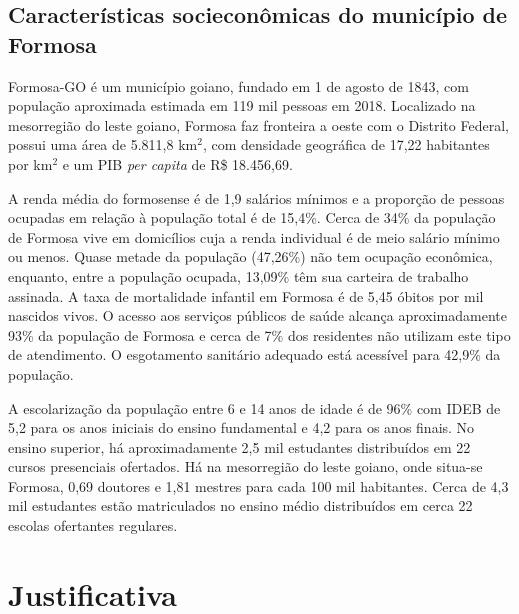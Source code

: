 \documentclass[
	10pt,				%
	openright,			%
	twoside,			%
	a4paper,			%
	english,			%
	french,				%
	brazil,				%
	sumario=tradicional
]{abntex2}
\begin{document}
\subsection*{Características socieconômicas do município de Formosa}

Formosa-GO é um município goiano, fundado em 1 de agosto de 1843, com população aproximada estimada em 119 mil pessoas em 2018. 
Localizado na mesorregião do leste goiano, Formosa faz fronteira a oeste com o Distrito Federal, possui uma área de 5.811,8 km$^2$, com densidade geográfica de 17,22 habitantes por km$^2$ e um PIB \textit{per capita} de R\$ 18.456,69. 

A renda média do formosense é de 1,9 salários mínimos e a proporção de pessoas ocupadas em relação à população total é de 15,4\%. 
Cerca de 34\% da população de Formosa vive em domicílios cuja a renda individual é de meio salário mínimo ou menos. 
Quase metade da população (47,26\%) não tem ocupação econômica, enquanto, entre a população ocupada, 13,09\% têm sua carteira de trabalho assinada.
A taxa de mortalidade infantil em Formosa é de 5,45 óbitos por mil nascidos vivos. 
O acesso aos serviços públicos de saúde alcança aproximadamente 93\%  da população de Formosa e cerca de 7\% dos residentes não utilizam este tipo de atendimento. 
O esgotamento sanitário adequado está acessível para 42,9\% da população.

A escolarização da população entre 6 e 14 anos de idade é de 96\% com IDEB de 5,2 para os anos iniciais do ensino fundamental e 4,2 para os anos finais. 
No ensino superior, há aproximadamente 2,5 mil estudantes distribuídos em 22 cursos presenciais ofertados. 
Há na mesorregião do leste goiano, onde situa-se Formosa, 0,69 doutores e 1,81 mestres para cada 100 mil habitantes.
Cerca de 4,3 mil estudantes estão matriculados no ensino médio distribuídos em cerca 22 escolas ofertantes regulares. 

\section*{Justificativa}
\end{document}
